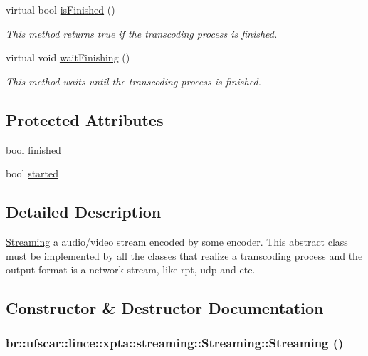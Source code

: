 \begin{DoxyCompactItemize}
virtual bool \hyperlink{classbr_1_1ufscar_1_1lince_1_1xpta_1_1streaming_1_1Streaming_a4f3f9a288774205347994431946b5b86}{isFinished} ()
\begin{DoxyCompactList}\small\item\em This method returns true if the transcoding process is finished. \item\end{DoxyCompactList}\item 
virtual void \hyperlink{classbr_1_1ufscar_1_1lince_1_1xpta_1_1streaming_1_1Streaming_ab0f85c46efde46613539316340daa721}{waitFinishing} ()
\begin{DoxyCompactList}\small\item\em This method waits until the transcoding process is finished. \item\end{DoxyCompactList}\end{DoxyCompactItemize}
\subsection*{Protected Attributes}
\begin{DoxyCompactItemize}
\item 
bool \hyperlink{classbr_1_1ufscar_1_1lince_1_1xpta_1_1streaming_1_1Streaming_ab6f682aa70a0cf5f960b4a800de06b3c}{finished}
\item 
bool \hyperlink{classbr_1_1ufscar_1_1lince_1_1xpta_1_1streaming_1_1Streaming_a7713f4c680738c9f1ba0d3f5a114a560}{started}
\end{DoxyCompactItemize}


\subsection{Detailed Description}
\hyperlink{classbr_1_1ufscar_1_1lince_1_1xpta_1_1streaming_1_1Streaming}{Streaming} a audio/video stream encoded by some encoder. This abstract class must be implemented by all the classes that realize a transcoding process and the output format is a network stream, like rpt, udp and etc. 

\subsection{Constructor \& Destructor Documentation}
\hypertarget{classbr_1_1ufscar_1_1lince_1_1xpta_1_1streaming_1_1Streaming_aa7a5e595f809abdd9eee1d76c5f83d9a}{
\subsubsection[{Streaming}]{\setlength{\rightskip}{0pt plus 5cm}br::ufscar::lince::xpta::streaming::Streaming::Streaming ()}}
\label{classbr_1_1ufscar_1_1lince_1_1xpta_1_1streaming_1_1Streaming_aa7a5e595f809abdd9eee1d76c5f83d9a}


